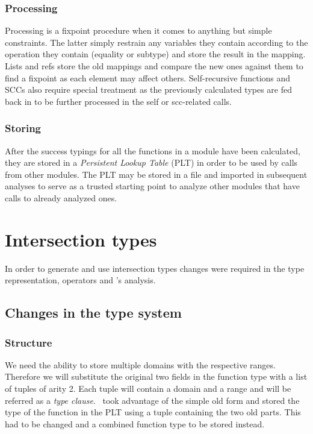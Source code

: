 \subsubsection{Processing}
\label{sct:orig_processing}

Processing is a fixpoint procedure when it comes to anything but
simple constraints. The latter simply restrain any variables they
contain according to the operation they contain (equality or subtype)
and store the result in the mapping. Lists and refs store the old
mappings and compare the new ones against them to find a fixpoint as
each element may affect others. Self-recursive functions and SCCs also
require special treatment as the previously calculated types are fed
back in to be further processed in the self or scc-related calls.

\subsubsection{Storing}
\label{sct:storing}

After the success typings for all the functions in a module have been
calculated, they are stored in a \emph{Persistent Lookup Table} (PLT)
in order to be used by calls from other modules. The PLT may be stored
in a file and imported in subsequent analyses to serve as a trusted
starting point to analyze other modules that have calls to already
analyzed ones.

\section{Intersection types}
\label{sct:intersection_types}

In order to generate and use intersection types changes were required
in the type representation, operators and \dr's analysis.

\subsection{Changes in the type system}
\label{sct:intersection_type_system}

\subsubsection{Structure}
\label{sct:intersection_representation}

We need the ability to store multiple domains with the respective
ranges. Therefore we will substitute the original two fields in the
function type with a list of tuples of arity 2. Each tuple will
contain a domain and a range and will be referred as a \emph{type
  clause}.  \dr\ took advantage of the simple old form and stored the
type of the function in the PLT using a tuple containing the two old
parts. This had to be changed and a combined function type to be
stored instead.

